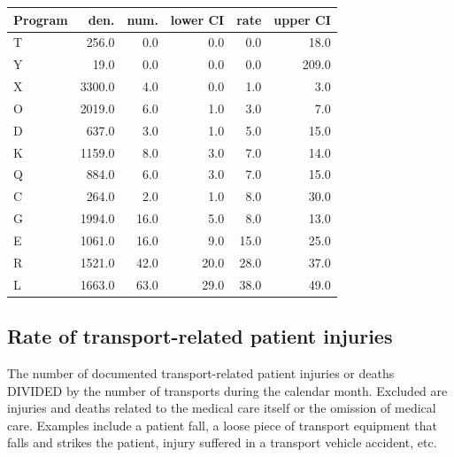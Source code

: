 \documentclass[twoside]{article}\usepackage[]{graphicx}\usepackage[]{color}
\begin{document}
\begin{table}[ht]
\centering
\begin{tabular}{lrrrrr}
  \hline
Program & den. & num. & lower CI & rate & upper CI \\ 
  \hline
T & 256.0 & 0.0 & 0.0 & 0.0 & 18.0 \\ 
  Y & 19.0 & 0.0 & 0.0 & 0.0 & 209.0 \\ 
  X & 3300.0 & 4.0 & 0.0 & 1.0 & 3.0 \\ 
  O & 2019.0 & 6.0 & 1.0 & 3.0 & 7.0 \\ 
  D & 637.0 & 3.0 & 1.0 & 5.0 & 15.0 \\ 
  K & 1159.0 & 8.0 & 3.0 & 7.0 & 14.0 \\ 
  Q & 884.0 & 6.0 & 3.0 & 7.0 & 15.0 \\ 
  C & 264.0 & 2.0 & 1.0 & 8.0 & 30.0 \\ 
  G & 1994.0 & 16.0 & 5.0 & 8.0 & 13.0 \\ 
  E & 1061.0 & 16.0 & 9.0 & 15.0 & 25.0 \\ 
  R & 1521.0 & 42.0 & 20.0 & 28.0 & 37.0 \\ 
  L & 1663.0 & 63.0 & 29.0 & 38.0 & 49.0 \\ 
   \hline
\end{tabular}
\end{table}




\newpage
\subsection{Rate of transport-related patient injuries}
The number of documented transport-related patient injuries or deaths DIVIDED by the number of transports during the calendar month. Excluded are injuries and deaths related to the medical care itself or the omission of medical care. Examples include a patient fall, a loose piece of transport equipment that falls and strikes the patient, injury suffered in a transport vehicle accident, etc.
\end{document}
